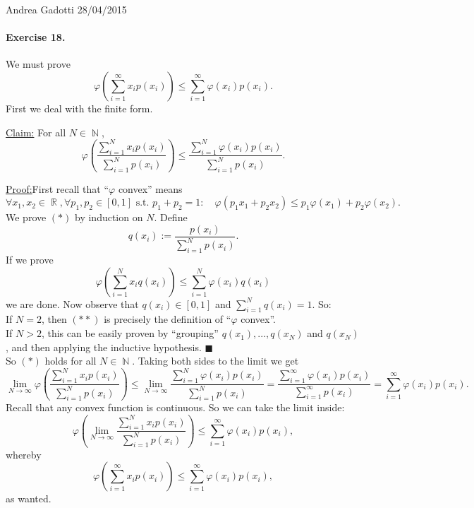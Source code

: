 \documentclass[12pt,a4paper]{report}
\theoremstyle{definition}
\theoremstyle{num.custom-title}
\newenvironment{claim}[1]{\par\noindent\underline{Claim#1:}\space}{} %
\newenvironment{claimproof}[1]{\par\noindent\underline{Proof:}\space#1}{\leavevmode\unskip\penalty9999 \hbox{}\nobreak\hfill\quad\hbox{$\blacksquare$}} %
\DeclareMathOperator{\N}{\mathbb{N}}
\DeclareMathOperator{\R}{\mathbb{R}}
\renewcommand{\phi}{\varphi}
\renewcommand{\1}{\mathbbm{1}}
\begin{document}
\noindent Andrea Gadotti \hfill 28/04/2015

\paragraph{Exercise 18.}
We must prove
\[
\phi \left( \sum_{i=1}^\infty x_i p(x_i) \right) \leq \sum_{i=1}^\infty \phi(x_i) p(x_i).
\]
First we deal with the finite form.
\begin{claim}{}
For all $N \in \N$,
\[
\phi \left( \frac{\sum_{i=1}^N x_i p(x_i)}{\sum_{i=1}^N p(x_i)} \right) \leq \frac{\sum_{i=1}^N \phi(x_i) p(x_i)}{\sum_{i=1}^N p(x_i)}. \tag{$*$}
\]
\begin{claimproof}
First recall that ``$\phi$ convex'' means
\[
\forall x_1, x_2 \in \R, \forall p_1,p_2 \in [0,1] \text{ s.t. } p_1+p_2=1 : \quad \phi(p_1 x_1 + p_2 x_2)\leq p_1 \phi(x_1) + p_2 \phi(x_2).
\]
We prove $(*)$ by induction on $N$. Define
\[
q(x_i) := \frac{p(x_i)}{\sum_{i=1}^N p(x_i)}.
\]
If we prove
\[
\phi \left( \sum_{i=1}^N x_i q(x_i) \right) \leq \sum_{i=1}^N \phi(x_i) q(x_i) \tag{$**$}
\]
we are done. Now observe that $q(x_i) \in [0,1]$ and $\sum_{i=1}^N q(x_i) = 1$. So:\\
If $N=2$, then $(**)$ is precisely the definition of ``$\phi$ convex''.\\
If $N>2$, this can be easily proven by ``grouping'' $q(x_1),...,q(x_N)$ and $q(x_N)$, and then applying the inductive hypothesis.
\end{claimproof}
\end{claim}
\\[6pt]
So $(*)$ holds for all $N \in \N$. Taking both sides to the limit we get
\[
\lim_{N \to \infty} \phi \left( \frac{\sum_{i=1}^N x_i p(x_i)}{\sum_{i=1}^N p(x_i)} \right) \leq \lim_{N \to \infty} \frac{\sum_{i=1}^N \phi(x_i) p(x_i)}{\sum_{i=1}^N p(x_i)} = \frac{\sum_{i=1}^\infty \phi(x_i) p(x_i)}{\sum_{i=1}^\infty p(x_i)} = \sum_{i=1}^\infty \phi(x_i) p(x_i).
\]
Recall that any convex function is continuous. So we can take the limit inside:
\[
\phi \left( \lim_{N \to \infty} \frac{\sum_{i=1}^N x_i p(x_i)}{\sum_{i=1}^N p(x_i)} \right) \leq \sum_{i=1}^\infty \phi(x_i) p(x_i),
\]
whereby
\[
\phi \left( \sum_{i=1}^\infty x_i p(x_i) \right) \leq \sum_{i=1}^\infty \phi(x_i) p(x_i),
\]
as wanted.
\end{document}
